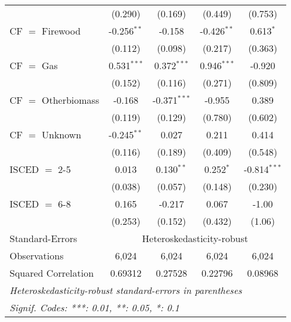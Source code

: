 \begin{table}[htbp!]
\begin{adjustbox}{width = 1\textwidth, max height = 0.95\textheight, center}
\begin{threeparttable}[b]
\begin{tabular}{lcccc}
                                 & (0.290)            & (0.169)            & (0.449)       & (0.753)\\   
            CF $=$ Firewood      & -0.256$^{**}$      & -0.158             & -0.426$^{**}$ & 0.613$^{*}$\\   
                                 & (0.112)            & (0.098)            & (0.217)       & (0.363)\\   
            CF $=$ Gas           & 0.531$^{***}$      & 0.372$^{***}$      & 0.946$^{***}$ & -0.920\\   
                                 & (0.152)            & (0.116)            & (0.271)       & (0.809)\\   
            CF $=$ Otherbiomass  & -0.168             & -0.371$^{***}$     & -0.955        & 0.389\\   
                                 & (0.119)            & (0.129)            & (0.780)       & (0.602)\\   
            CF $=$ Unknown       & -0.245$^{**}$      & 0.027              & 0.211         & 0.414\\   
                                 & (0.116)            & (0.189)            & (0.409)       & (0.548)\\   
            ISCED $=$ 2-5        & 0.013              & 0.130$^{**}$       & 0.252$^{*}$   & -0.814$^{***}$\\   
                                 & (0.038)            & (0.057)            & (0.148)       & (0.230)\\   
            ISCED $=$ 6-8        & 0.165              & -0.217             & 0.067         & -1.00\\   
                                 & (0.253)            & (0.152)            & (0.432)       & (1.06)\\   
            \midrule 
            Standard-Errors & \multicolumn{4}{c}{Heteroskedasticity-robust} \\ 
            Observations         & 6,024              & 6,024              & 6,024         & 6,024\\  
            Squared Correlation  & 0.69312            & 0.27528            & 0.22796       & 0.08968\\  
            \midrule \midrule
            \multicolumn{5}{l}{\emph{Heteroskedasticity-robust standard-errors in parentheses}}\\
            \multicolumn{5}{l}{\emph{Signif. Codes: ***: 0.01, **: 0.05, *: 0.1}}\\
         \end{tabular}
         

\end{threeparttable}
\end{adjustbox}
\end{table}
